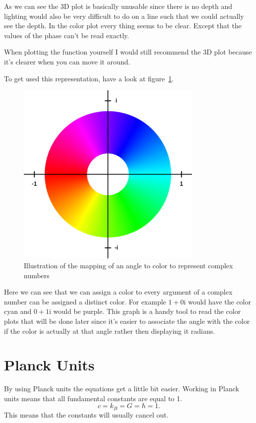 \documentclass[11pt,DIV=10,final]{scrreprt} %
\newcommand{\mi}{{\text{i}}}
\begin{document}
\pagebreak[4]
As we can see the 3D plot is basically unusable since there is no depth and lighting would also be very difficult to do on a line such that we could actually see the depth.
In the color plot every thing seems to be clear. Except that the values of the phase can't be read exactly.

When plotting the function yourself I would still recommend the 3D plot because it's clearer when you can move it around.

To get used this representation, have a look at figure~\ref{fig:color-to-phase-circle}.
\begin{figure}[H]
  \centering
  \includegraphics[width=0.8\textwidth]{plots/color_circle.png}
  \caption{Illustration of the mapping of an angle to color to represent complex numbers}\label{fig:color-to-phase-circle}
\end{figure}
Here we can see that we can assign a color to every argument of a complex number can be assigned a distinct color.
For example $1 + 0 \mi$ would have the color cyan and $0 + 1 \mi$ would be purple.
This graph is a handy tool to read the color plots that will be done later since it's easier to associate the angle with the color if the color is actually at that angle
rather then displaying it radians.

\section{Planck Units}
By using Planck units the equations get a little bit easier.
Working in Planck units means that all fundamental constants are equal to 1.
\[
  c = k_{B} = G = \hbar = 1.
\]
This means that the constants will usually cancel out.
\end{document}

